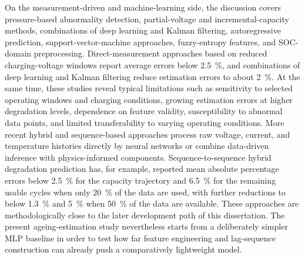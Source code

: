 \documentclass[
    a4paper,
    12pt,
    titlepage,
    bibliography=totoc,
    twoside=on,
    parskip=false,
    numbers=noenddot,
    cleardoublepage=empty,
    DIV=12,
    BCOR=12.0mm,
    headheight=36pt,
    headings=openright
]{scrreprt}
\begin{document}
On the measurement-driven and machine-learning side, the discussion covers pressure-based abnormality detection, partial-voltage and incremental-capacity methods, combinations of deep learning and Kalman filtering, autoregressive prediction, support-vector-machine approaches, fuzzy-entropy features, and SOC-domain preprocessing. Direct-measurement approaches based on reduced charging-voltage windows report average errors below \SI{2.5}{\percent}, and combinations of deep learning and Kalman filtering reduce estimation errors to about \SI{2}{\percent}. At the same time, these studies reveal typical limitations such as sensitivity to selected operating windows and charging conditions, growing estimation errors at higher degradation levels, dependence on feature validity, susceptibility to abnormal data points, and limited transferability to varying operating conditions.\autocite{ebertDetectionCellstackInhomogeneities2017,stroeStateofHealthEstimationLithiumIon2018,stroeSOHEstimationLMO2018,shiOptimizationStateCharge2021,kimImprovedStateofhealthPrediction2022,xiongOnlineStateofHealthEstimation2021,suiRobustFuzzyEntropyBased2022,joBatteryStateofHealthEstimation2021} More recent hybrid and sequence-based approaches process raw voltage, current, and temperature histories directly by neural networks or combine data-driven inference with physics-informed components. Sequence-to-sequence hybrid degradation prediction has, for example, reported mean absolute percentage errors below \SI{2.5}{\percent} for the capacity trajectory and \SI{6.5}{\percent} for the remaining usable cycles when only \SI{20}{\percent} of the data are used, with further reductions to below \SI{1.3}{\percent} and \SI{5}{\percent} when \SI{50}{\percent} of the data are available. These approaches are methodologically close to the later development path of this dissertation. The present ageing-estimation study nevertheless starts from a deliberately simpler MLP baseline in order to test how far feature engineering and lag-sequence construction can already push a comparatively lightweight model.\autocite{xuNovelHybridPhysicsBased2023,pangPhysicsinformedNeuralNetwork2023,kimEstimationLiionBattery2018,chaouiAgingPredictionState2017}
\end{document}
